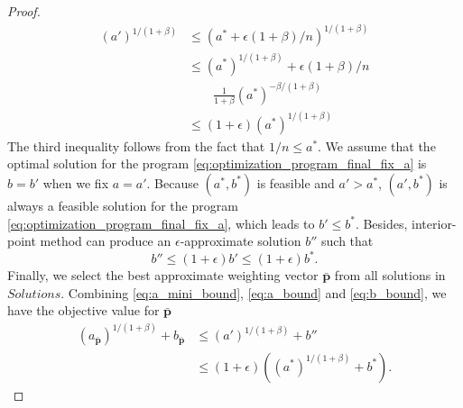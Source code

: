 \documentclass[letterpaper]{article} %
\newcommand{\probdistri}{\mathbf{p}}
\newcommand{\complexbound}{\beta}
\newcommand{\red}[1]{\textcolor{red}{#1}}
\newcommand{\todo}[1]{\red{\textsc{todo:} #1}}
\begin{document}
\begin{proof}
  \begin{equation}
  \label{eq:a_bound}
  \begin{aligned}
    (a')^{1/(1+\complexbound{})}&\le (a^*+\epsilon(1+\beta)/n)^{1/(1+\complexbound{})}\\
    &\le (a^*)^{1/(1+\complexbound{})} + \epsilon(1+\beta)/n\\
    &\qquad\frac{1}{1+\complexbound{}}(a^*)^{-\complexbound{}/(1+\complexbound{})}\\
    &\le (1+\epsilon)(a^*)^{1/(1+\complexbound{})}
  \end{aligned}
  \end{equation}
  The third inequality follows from the fact that $1/n\le a^*$.
  We assume that the optimal solution for the program \eqref{eq:optimization_program_final_fix_a} is $b=b'$ when we fix $a=a'$.
  Because $(a^*,b^*)$ is feasible and $a'>a^*$, $(a', b^*)$ is always a feasible solution for the program \eqref{eq:optimization_program_final_fix_a}, which leads to $b'\le b^*$.
  Besides, interior-point method can produce an $\epsilon$-approximate solution $b''$ such that
  \begin{equation}
    \label{eq:b_bound}
    b''\le (1+\epsilon)b'\le (1+\epsilon)b^*.
  \end{equation}
  Finally, we select the best approximate weighting vector $\bar{\probdistri{}}$ from all solutions in $Solutions$. 
  Combining \eqref{eq:a_mini_bound}, \eqref{eq:a_bound} and \eqref{eq:b_bound}, we have the objective value for $\bar{\probdistri{}}$
  \begin{align*}
    (a_{\bar{\probdistri{}}})^{1/(1+\complexbound{})} + b_{\bar{\probdistri{}}} & \le (a')^{1/(1+\complexbound{})} + b''\\
    &\le (1+\epsilon)((a^*)^{1/(1+\complexbound{})} + b^*).
  \end{align*}
\end{proof}


\end{document}
